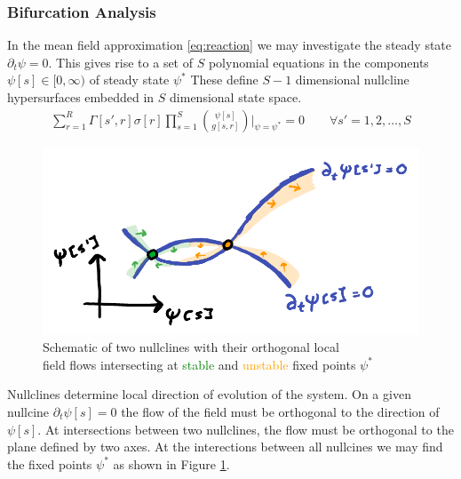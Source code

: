 \documentclass{article}[12pt]
\numberwithin{equation}{section}
\begin{document}
\subsubsection{Bifurcation Analysis}\vspace{-15pt}
In the mean field approximation \eqref{eq:reaction} we may investigate the
steady state $\partial_t\psi=0$. This gives rise to a set of $S$ polynomial
equations in the components $\psi[s]\in[0,\infty)$ of steady state $\psi^*$
These define $S-1$ dimensional nullcline hypersurfaces embedded in $S$
dimensional state space.
\begin{align}
	\sum_{r=1}^R\Gamma[s',r]\sigma[r]
		\prod_{s=1}^S{\psi[s] \choose g[s,r]}
		\bigg|_{\psi=\psi^*}
		=0\qquad\forall s'=1,2,\dots,S
	\label{eq:steadystate}
\end{align}
\vspace{-20pt}
\begin{figure}[H]
\centering{}
\captionsetup{justification=centering}
\includegraphics[scale=0.35]{figures/nullclines}
\caption{Schematic of two nullclines with their orthogonal local\\ field flows intersecting
at \textcolor{Green}{stable} and \textcolor{orange}{unstable} fixed points $\psi^*$}
\label{fig:nullclines}
\end{figure}
Nullclines determine local direction of evolution of the system. On a given
nullcine $\partial_t\psi[s]=0$ the flow of the field must be orthogonal to
the direction of $\psi[s]$. At intersections between two nullclines, the flow
must be orthogonal to the plane defined by two axes. At the interections between
all nullcines we may find the fixed points $\psi^*$ as shown in Figure \ref{fig:nullclines}.
\end{document}

